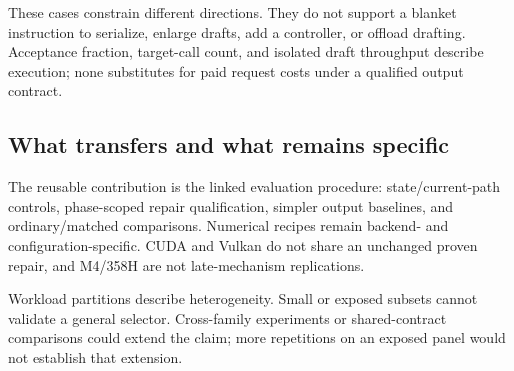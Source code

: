 These cases constrain different directions. They do not support a blanket instruction to serialize, enlarge drafts, add a controller, or offload drafting. Acceptance fraction, target-call count, and isolated draft throughput describe execution; none substitutes for paid request costs under a qualified output contract.

\subsection{What transfers and what remains specific}
The reusable contribution is the linked evaluation procedure: state/current-path controls, phase-scoped repair qualification, simpler output baselines, and ordinary/matched comparisons. Numerical recipes remain backend- and configuration-specific. CUDA and Vulkan do not share an unchanged proven repair, and M4/358H are not late-mechanism replications.

Workload partitions describe heterogeneity. Small or exposed subsets cannot validate a general selector. Cross-family experiments or shared-contract comparisons could extend the claim; more repetitions on an exposed panel would not establish that extension.

